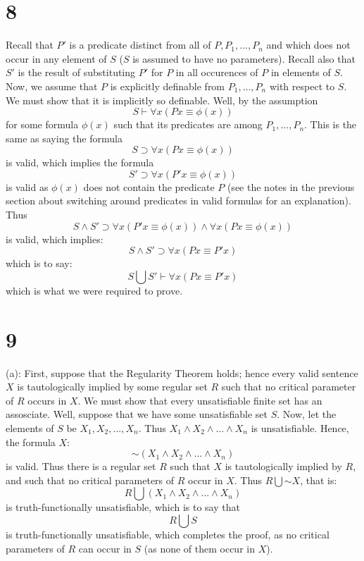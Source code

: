 \documentclass{article}
\newcommand*{\oldneg}{\mathord{\sim}}
\theoremstyle{definition}
\begin{document}
\section*{8}
Recall that $P'$ is a predicate distinct from all of $P,P_1,...,P_n$ and which does not occur in any element of $S$ ($S$ is assumed to have no 
parameters). Recall also that $S'$ is the result of substituting $P'$ for $P$ in all occurences of $P$ in elements of $S$. Now, we assume that 
$P$ is explicitly definable from $P_1,...,P_n$ with respect to $S$. We must show that it is implicitly so definable. Well, by the assumption
\[ S\vdash \forall x\left(Px\equiv\phi\left( x\right)\right) \] for some formula $\phi(x)$ such that its predicates are among $P_1,...,P_n$. 
This is the same as saying the formula \[ S\supset\forall x\left(Px\equiv\phi\left( x\right)\right) \] is valid, which implies the formula 
\[ S'\supset\forall x\left(P'x\equiv\phi\left( x\right)\right) \] is valid as $\phi(x)$ does not contain the predicate $P$ 
(see the notes in the previous section about 
switching around predicates in valid formulas for an explanation). Thus
\[ S\wedge S'\supset\forall x\left(P'x\equiv\phi\left( x\right)\right)\wedge\forall x\left(Px\equiv\phi\left( x\right)\right) \] is valid, which implies:
\[ S\wedge S'\supset\forall x\left(Px\equiv P'x\right) \] which is to say:
\[ S\bigcup S'\vdash\forall x\left(Px\equiv P'x\right) \] which is what we were required to prove.

\section*{9}
(a): First, suppose that the Regularity Theorem holds; hence every valid sentence $X$ is tautologically implied by some regular set $R$ such that no critical parameter of 
$R$ occurs in $X$. We must show that every unsatisfiable finite set has an assosciate. Well, suppose that we have some unsatisfiable set $S$. Now, let the elements of 
$S$ be $X_1,X_2,...,X_n$. Thus $X_1\wedge X_2\wedge ...\wedge X_n$ is unsatisfiable. Hence, the formula $X$:
\[ \oldneg\left(X_1\wedge X_2\wedge ...\wedge X_n\right) \] is valid. Thus there is a regular set $R$ such that $X$ is tautologically implied by $R$, and 
such that no critical parameters of $R$ occur in $X$. Thus $R\bigcup \oldneg X$, that is:
\[ R\bigcup \left(X_1\wedge X_2\wedge ...\wedge X_n\right) \] is truth-functionally unsatisfiable, which is to say that \[ R\bigcup S \] is truth-functionally unsatisfiable, 
which completes the proof, as no critical parameters of $R$ can occur in $S$ (as none of them occur in $X$).
\end{document}
